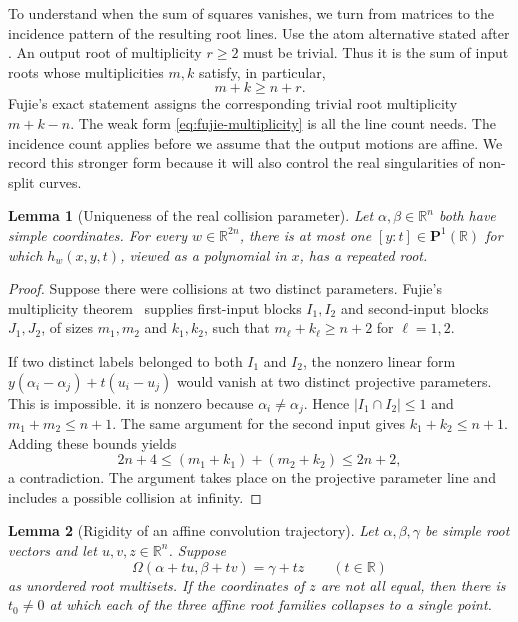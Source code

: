 \documentclass[12pt,reqno]{amsart}
\newtheorem{lemma}[lemma]{Lemma}
\theoremstyle{definition}
\theoremstyle{remark}
\newcommand{\R}{\mathbb R}
\begin{document}
To understand when the sum of squares vanishes, we turn from matrices to the incidence pattern of the resulting root lines.  Use the atom alternative stated after
.  An output root of multiplicity
\(r\geq2\) must be trivial.  Thus it is the sum of input roots whose
multiplicities \(m,k\) satisfy, in particular,
\begin{equation}\label{eq:fujie-multiplicity}
 m+k\geq n+r.
\end{equation}
Fujie's exact statement assigns the corresponding trivial root multiplicity \(m+k-n\). The weak form \eqref{eq:fujie-multiplicity} is all the line count needs. The incidence count applies before we assume that the output motions are affine. We record this stronger form because it will also control the real singularities of non-split curves.

\begin{lemma}[Uniqueness of the real collision parameter]
\label{lem:unique-real-collision-fiber}
Let \(\alpha,\beta\in\R^n\) both have simple coordinates.
For every \(w\in\R^{2n}\), there is at most one
\([y:t]\in\mathbf P^1(\R)\) for which \(h_w(x,y,t)\), viewed as a
polynomial in \(x\), has a repeated root.
\end{lemma}

\begin{proof}
Suppose there were collisions at two distinct parameters.  Fujie's
multiplicity theorem~\cite{Fujie26} supplies first-input blocks \(I_1,I_2\) and
second-input blocks \(J_1,J_2\), of sizes \(m_1,m_2\) and
\(k_1,k_2\), such that \(m_\ell+k_\ell\geq n+2\) for
\(\ell=1,2\).

If two distinct labels belonged to both \(I_1\) and \(I_2\), the
nonzero linear form \(y(\alpha_i-\alpha_j)+t(u_i-u_j)\) would vanish at two distinct
projective parameters.  This is impossible. it is nonzero because \(\alpha_i\ne\alpha_j\).  Hence \(|I_1\cap I_2|\leq1\) and \(m_1+m_2\leq n+1\).  The same argument for the second input gives
\(k_1+k_2\leq n+1\).  Adding these bounds yields \begin{equation}\label{eq:collision-contradiction}
 2n+4\leq(m_1+k_1)+(m_2+k_2)\leq2n+2,
\end{equation}
a contradiction.  The argument takes place on the projective parameter
line and includes a possible collision at infinity.
\end{proof}

\begin{lemma}[Rigidity of an affine convolution trajectory]
\label{lem:trajectory-rigidity}
Let \(\alpha,\beta,\gamma\) be simple root vectors and let
\(u,v,z\in\R^n\).  Suppose
\begin{equation}\label{eq:abstract-affine-trajectory}
 \Omega(\alpha+tu,\beta+tv)=\gamma+tz\qquad(t\in\R)
\end{equation}
as unordered root multisets.  If the coordinates of \(z\) are not all
equal, then there is \(t_0\ne0\) at which each of the three affine root
families collapses to a single point.
\end{lemma}
\end{document}
